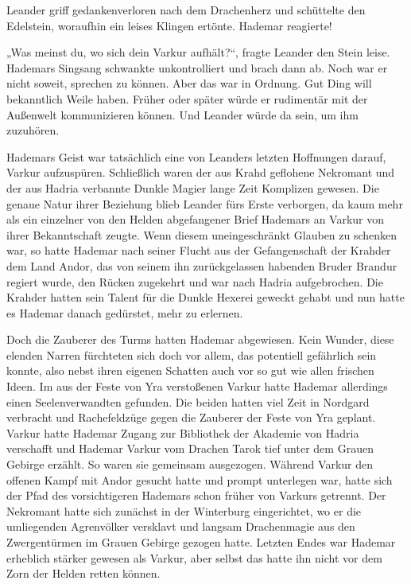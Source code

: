\documentclass[10pt, a4paper, oneside]{book}
\begin{document}
Leander griff gedankenverloren nach dem Drachenherz und schüttelte den Edelstein, woraufhin ein leises Klingen ertönte. Hademar reagierte!

„Was meinst du, wo sich dein Varkur aufhält?“, fragte Leander den Stein leise. Hademars Singsang schwankte unkontrolliert und brach dann ab. Noch war er nicht soweit, sprechen zu können. Aber das war in Ordnung. Gut Ding will bekanntlich Weile haben. Früher oder später würde er rudimentär mit der Außenwelt kommunizieren können. Und Leander würde da sein, um ihm zuzuhören.

Hademars Geist war tatsächlich eine von Leanders letzten Hoffnungen darauf, Varkur aufzuspüren. Schließlich waren der aus Krahd geflohene Nekromant und der aus Hadria verbannte Dunkle Magier lange Zeit Komplizen gewesen. Die genaue Natur ihrer Beziehung blieb Leander fürs Erste verborgen, da kaum mehr als ein einzelner von den Helden abgefangener Brief Hademars an Varkur von ihrer Bekanntschaft zeugte. Wenn diesem uneingeschränkt Glauben zu schenken war, so hatte Hademar nach seiner Flucht aus der Gefangenschaft der Krahder dem Land Andor, das von seinem ihn zurückgelassen habenden Bruder Brandur regiert wurde, den Rücken zugekehrt und war nach Hadria aufgebrochen. Die Krahder hatten sein Talent für die Dunkle Hexerei geweckt gehabt und nun hatte es Hademar danach gedürstet, mehr zu erlernen.

Doch die Zauberer des Turms hatten Hademar abgewiesen. Kein Wunder, diese elenden Narren fürchteten sich doch vor allem, das potentiell gefährlich sein konnte, also nebst ihren eigenen Schatten auch vor so gut wie allen frischen Ideen. Im aus der Feste von Yra verstoßenen Varkur hatte Hademar allerdings einen Seelenverwandten gefunden. Die beiden hatten viel Zeit in Nordgard verbracht und Rachefeldzüge gegen die Zauberer der Feste von Yra geplant. Varkur hatte Hademar Zugang zur Bibliothek der Akademie von Hadria verschafft und Hademar Varkur vom Drachen Tarok tief unter dem Grauen Gebirge erzählt. So waren sie gemeinsam ausgezogen. Während Varkur den offenen Kampf mit Andor gesucht hatte und prompt unterlegen war, hatte sich der Pfad des vorsichtigeren Hademars schon früher von Varkurs getrennt. Der Nekromant hatte sich zunächst in der Winterburg eingerichtet, wo er die umliegenden Agrenvölker versklavt und langsam Drachenmagie aus den Zwergentürmen im Grauen Gebirge gezogen hatte. Letzten Endes war Hademar erheblich stärker gewesen als Varkur, aber selbst das hatte ihn nicht vor dem Zorn der Helden retten können.
\end{document}
